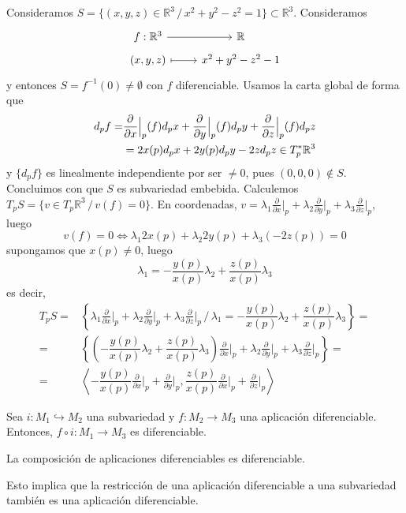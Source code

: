 \begin{ejem}
     Consideramos $S=\{(x,y,z) \in \mathbb R^3 \, / \, x^2+y^2-z^2=1\} \subset \mathbb R^3$. Consideramos 
    $$\bt f : \mathbb R^3 \arrow{r} & \mathbb R \\[-5mm] (x,y,z) \arrow[mapsto]{r} & x^2+y^2-z^2-1 \et$$
    y entonces $S=f^{-1}(0)\neq\emptyset$ con $f$ diferenciable. Usamos la carta global de forma que 
    \[\begin{split} d_pf=& \dfrac{\partial^{} }{\partial x}\Big|_p(f) d_px + \dfrac{\partial^{} }{\partial y}\Big|_p(f) d_py + \dfrac{\partial^{} }{\partial z}\Big|_p(f) d_pz \\ & = 2x(p)d_px+2y(p)d_py-2zd_pz \in T_p^*\mathbb R^3\end{split}\]
    y $\{d_pf\}$ es linealmente independiente por ser $\neq 0$, pues $(0,0,0) \nin S$. Concluimos con que $S$ es subvariedad embebida. Calculemos $T_pS = \{v \in T_p\mathbb R^3 \, / \, v(f)=0\}$. En coordenadas, $v = \lambda_1 \frac{\partial}{\partial x}\big|_p+\lambda_2 \frac{\partial}{\partial y}\big|_p+\lambda_3 \frac{\partial}{\partial z}\big|_p$, luego 
    $$v(f)=0 \iff \lambda_1 2x(p) + \lambda_2 2y(p) + \lambda_3(-2z(p)) = 0$$
    supongamos que $x(p)\neq 0$, luego 
    $$\lambda_1 = -\dfrac{y(p)}{x(p)} \lambda_2 + \dfrac{z(p)}{x(p)} \lambda_3$$
    es decir, 
    \[ \begin{split} T_pS = & \left\{\lambda_1 \frac{\partial}{\partial x}\Big|_p+\lambda_2 \frac{\partial}{\partial y}\Big|_p+\lambda_3 \frac{\partial}{\partial z}\Big|_p \, \Big/ \, \lambda_1 = -\dfrac{y(p)}{x(p)} \lambda_2 + \dfrac{z(p)}{x(p)} \lambda_3 \right\}= 
    \\ = & \left\{ \left( -\dfrac{y(p)}{x(p)} \lambda_2 + \dfrac{z(p)}{x(p)} \lambda_3 \right)\frac{\partial}{\partial x}\Big|_p+\lambda_2 \frac{\partial}{\partial y}\Big|_p+\lambda_3 \frac{\partial}{\partial z}\Big|_p \right\} = \\ = & \left\langle -\dfrac{y(p)}{x(p)} \frac{\partial}{\partial x}\Big|_p  +  \frac{\partial}{\partial y}\Big|_p , \dfrac{z(p)}{x(p)} \frac{\partial}{\partial x}\Big|_p  +  \frac{\partial}{\partial z}\Big|_p  \right\rangle \end{split}\]
\end{ejem}
\begin{prop}
Sea $i: M_1\hookrightarrow M_2$ una subvariedad y $f: M_2 \to M_3$ una aplicación diferenciable. Entonces, $f \circ i:M_1 \to M_3$ es diferenciable. 
\end{prop}
\begin{dem}
La composición de aplicaciones diferenciables es diferenciable.
\end{dem}
\begin{obs}
Esto implica que la restricción de una aplicación diferenciable a una subvariedad también es una aplicación diferenciable.
\end{obs}

